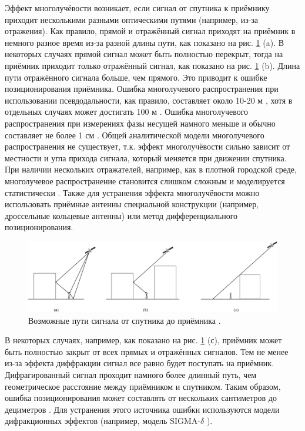 Эффект многолучёвости возникает, если сигнал от спутника к приёмнику приходит несколькими разными оптическими путями (например, из-за отражения).
Как правило, прямой и отражённый сигнал приходят на приёмник в немного разное время из-за разной длины пути, как показано на рис. \ref{fig-signal-paths} (a).
В некоторых случаях прямой сигнал может быть полностью перекрыт, тогда на приёмник приходит только отражённый сигнал, как показано на рис. \ref{fig-signal-paths} (b).
Длина пути отражённого сигнала больше, чем прямого.
Это приводит к ошибке позиционирования приёмника.
Ошибка многолучевого распространения при использовании псевдодальности, как правило, составляет около 10-20 м \cite{Wells1987}, хотя в отдельных случаях может достигать 100 м \cite{VanNee1992}.
Ошибка многолучевого распространения при измерениях фазы несущей намного меньше и обычно составляет не более 1 см \cite{Hofmann2008}. 
Общей аналитической модели многолучевого распространения не существует, т.к. эффект многолучёвости сильно зависит от местности и угла прихода сигнала, который меняется при движении спутника. 
При наличии нескольких отражателей, например, как в плотной городской среде, многолучевое распространение становится слишком сложным и моделируется статистически \cite{Rappaport2002}. 
Также для устранения эффекта многолучёвости можно использовать приёмные антенны специальной конструкции (например, дроссельные кольцевые антенны) или метод дифференциального позиционирования.
\vspace{1em}
\begin{figure}[h]
\centering    
\includegraphics[width=0.9\linewidth]{fig/signal-paths.png}    
\caption{Возможные пути сигнала от спутника до приёмника \cite{Seeber2003}.}
\label{fig-signal-paths}      
\end{figure}

В некоторых случаях, например, как показано на рис. \ref{fig-signal-paths} (с), приёмник может быть полностью закрыт от всех прямых и отражённых сигналов.
Тем не менее из-за эффекта диффракции сигнал все равно будет поступать на приёмник.
Дифрагированный сигнал проходит намного более длинный путь, чем геометрическое расстояние между приёмником и спутником.
Таким образом, ошибка позиционирования может составлять от нескольких сантиметров до дециметров \cite{Seeber2003}.
Для устранения этого источника ошибки используются модели дифракционных эффектов (например, модель SIGMA-$\delta$ \cite{Brunner1999}).

